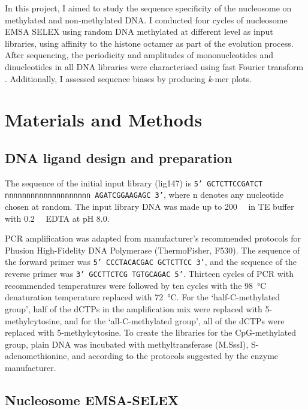 \documentclass[parskip=full, numbers=noenddot]{scrbook}
\begin{document}
In this project, I aimed to study the sequence specificity of the nucleosome on methylated and non-methylated DNA.  I conducted four cycles of nucleosome EMSA SELEX using random DNA methylated at different level as input libraries, using affinity to the histone octamer as part of the evolution process.  After sequencing, the periodicity and amplitudes of mononucleotides and dinucleotides in all DNA libraries were characterised using fast Fourier transform \citep{lowary_new_1998, zhu_interaction_2018}.  Additionally, I assessed sequence biases by producing \emph{k}-mer plots.

\section{Materials and Methods}
\label{sec:emsaselex_methods}

\subsection{DNA ligand design and preparation}
\label{ssec:emsaselex_methods_lig}

The sequence of the initial input library (lig147) is \texttt{5' GCTCTTCCGATCT nnnnnnnnn\-nnnnnnnnnnn AGATCGGAAGAGC 3'}, where n denotes any nucleotide chosen at random. The input library DNA was made up to \SI{200}{\nano\Molar} in TE buffer with \SI{0.2}{\milli\Molar} EDTA at pH 8.0.

PCR amplification was adapted from manufacturer's recommended protocols for Phusion High-Fidelity DNA Polymerase (ThermoFisher, F530).  The sequence of the forward primer was \texttt{5' CCCTACACGAC GCTCTTCC 3'}, and the sequence of the reverse primer was \texttt{3' GCCTTCTCG TGTGCAGAC 5'}.  Thirteen cycles of PCR with recommended temperatures were followed by ten cycles with the \SI{98}{\celsius} denaturation temperature replaced with \SI{72}{\celsius}.  For the `half-C-methylated group', half of the dCTPs in the amplification mix were replaced with 5-methylcytosine, and for the `all-C-methylated group', all of the dCTPs were replaced with 5-methylcytosine.  To create the libraries for the CpG-methylated group, plain DNA was incubated with methyltransferase (M.SssI), S-adenomethionine, and  according to the protocols suggested by the enzyme manufacturer.

\subsection{Nucleosome EMSA-SELEX}
\label{ssec:emsaselex_methods_selex}
\end{document}
